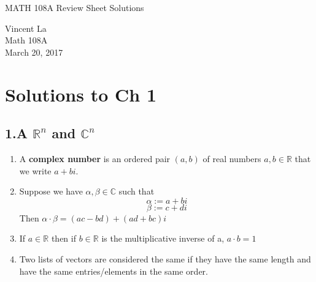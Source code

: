 \documentclass[11pt]{article}
\title{ }
\begin{document}
	\begin{center}	%
		\Large{MATH 108A Review Sheet Solutions}	%
	\end{center}
	\begin{center}
		Vincent La \\
		Math 108A \\
		March 20, 2017
	\end{center}

\section*{Solutions to Ch 1}
\subsection*{1.A $\mathbb{R}^n$ and $\mathbb{C}^n$}
\begin{enumerate}
	\item A \textbf{complex number} is an ordered pair $(a, b)$ of real numbers $a, b \in \mathbb{R}$ that we write $a + bi$.
	\item Suppose we have $\alpha, \beta \in \mathbb{C}$ such that
	\[\alpha := a + bi \]
	\[\beta := c + di \]
	Then $\alpha \cdot \beta = (ac - bd) + (ad + bc)i$
	\item If $a \in \mathbb{R}$ then if $b \in \mathbb{R}$ is the multiplicative inverse of a, $a \cdot b = 1$
	\item Two lists of vectors are considered the same if they have the same length and have the same entries/elements in the same order.
\end{enumerate}
\end{document}
